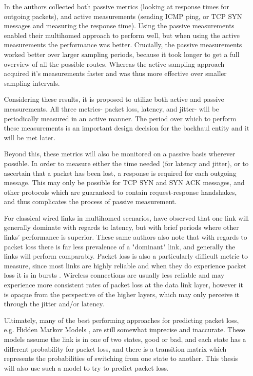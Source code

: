 In \cite{akella2008performance} the authors collected both passive metrics (looking at response times for outgoing packets), and active measurements (sending ICMP ping, or TCP SYN messages and measuring the response time). Using the passive measurements enabled their multihomed approach to perform well, but when using the active measurements the performance was better. Crucially, the passive measurements worked better over larger sampling periods, because it took longer to get a full overview of all the possible routes. Whereas the active sampling approach acquired it's measurements faster and was thus more effective over smaller sampling intervals.

Considering these results, it is proposed to utilize both active and passive measurements. All three metrics- packet loss, latency, and jitter- will be periodically measured in an active manner. The period over which to perform these measurements is an important design decision for the backhaul entity and it will be met later.

Beyond this, these metrics will also be monitored on a passive basis wherever possible. In order to measure either the time needed (for latency and jitter), or to ascertain that a packet has been lost, a response is required for each outgoing message. This may only be possible for TCP SYN and SYN ACK messages, and other protocols which are guaranteed to contain request-response handshakes, and thus complicates the process of passive measurement.

For classical wired links in multihomed scenarios, \cite{tao2004exploring} have observed that one link will generally dominate with regards to latency, but with brief periods where other links' performance is superior. These same authors also note that with regards to packet loss there is far less prevalence of a "dominant" link, and generally the links will perform comparably. Packet loss is also a particularly difficult metric to measure, since most links are highly reliable and when they do experience packet loss it is in bursts \cite{tao2004exploring}. Wireless connections are usually less reliable and may experience more consistent rates of packet loss at the data link layer, however it is opaque from the perspective of the higher layers, which may only perceive it through the jitter and/or latency.

 Ultimately, many of the best performing approaches for predicting packet loss, e.g. Hidden Markov Models \cite{tao2004exploring, bremler2002predicting}, are still somewhat imprecise and inaccurate. These models assume the link is in one of two states, good or bad, and each state has a different probability for packet loss, and there is a transition matrix which represents the probabilities of switching from one state to another. This thesis will also use such a model to try to predict packet loss. 

